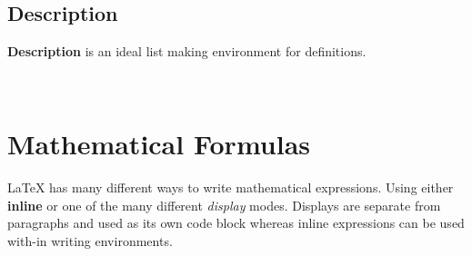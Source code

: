 \\


\subsection{Description}
\textbf{Description} is an ideal list making environment for definitions.

\\

\section{Mathematical Formulas}

\LaTeX{} has many different ways to write mathematical expressions. 
Using either \textbf{inline} or one of the many different 
\textit{display} modes. Displays are separate from paragraphs and 
used as its own code block whereas inline expressions can be used
with-in writing environments. \\

